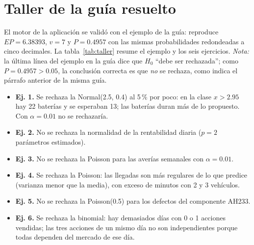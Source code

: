 \documentclass[11pt]{article}
\begin{document}
\section{Taller de la guía resuelto}
El motor de la aplicación se validó con el ejemplo de la guía: reproduce $EP=6.38393$, $v=7$ y $P=0.4957$ con las
mismas probabilidades redondeadas a cinco decimales. La tabla~\ref{tab:taller} resume el ejemplo y los seis
ejercicios. \emph{Nota:} la última línea del ejemplo en la guía dice que $H_0$ ``debe ser rechazada''; como
$P=0.4957>0.05$, la conclusión correcta es que \emph{no} se rechaza, como indica el párrafo anterior de la misma guía.
\begin{itemize}
\item \textbf{Ej. 1.} Se rechaza la Normal(2.5, 0.4) al 5\,\% por poco: en la clase $x>2.95$ hay 22 baterías y se
esperaban 13; las baterías duran más de lo propuesto. Con $\alpha=0.01$ no se rechazaría.
\item \textbf{Ej. 2.} No se rechaza la normalidad de la rentabilidad diaria ($p=2$ parámetros estimados).
\item \textbf{Ej. 3.} No se rechaza la Poisson para las averías semanales con $\alpha=0.01$.
\item \textbf{Ej. 4.} Se rechaza la Poisson: las llegadas son más regulares de lo que predice (varianza menor que la
media), con exceso de minutos con 2 y 3 vehículos.
\item \textbf{Ej. 5.} No se rechaza la Poisson(0.5) para los defectos del componente AH233.
\item \textbf{Ej. 6.} Se rechaza la binomial: hay demasiados días con 0 o 1 acciones vendidas; las tres acciones de
un mismo día no son independientes porque todas dependen del mercado de ese día.
\end{itemize}
\end{document}
